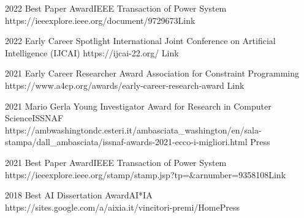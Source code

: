 \documentclass[localFont,alternative]{documentMETADATA}
\begin{document}
\begin{awards}
	\awardentry
	{2022}
	{Best Paper Award}{IEEE Transaction of Power System}
	{https://ieeexplore.ieee.org/document/9729673}{Link}

	\awardentry
	{2022}
	{Early Career Spotlight}%
	{International Joint Conference on Artificial Intelligence (IJCAI)}
	{https://ijcai-22.org/}
	{Link}

	\awardentry
	{2021}
	{Early Career Researcher Award}
	{Association for Constraint Programming}
	{https://www.a4cp.org/awards/early-career-research-award}
	{Link}

	\awardentry
	{2021}
	{Mario Gerla Young Investigator Award for Research in Computer Science}{ISSNAF}
	{https://ambwashingtondc.esteri.it/ambasciata_washington/en/sala-stampa/dall_ambasciata/issnaf-awards-2021-ecco-i-migliori.html}
	{Press}

		
	\awardentry
	{2021}
	{Best Paper Award}{IEEE Transaction of Power System}
	{https://ieeexplore.ieee.org/stamp/stamp.jsp?tp=\&arnumber=9358108}{Link}

	\awardentry
	{2018}
	{Best AI Dissertation Award}{AI*IA} %
	{https://sites.google.com/a/aixia.it/vincitori-premi/Home}{Press}


\end{awards}	


\end{document}
